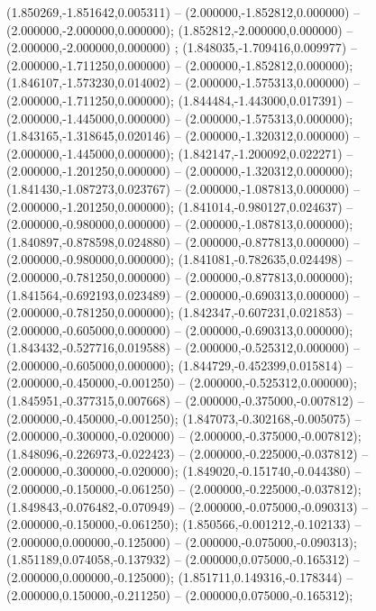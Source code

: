  (1.850269,-1.851642,0.005311) -- (2.000000,-1.852812,0.000000) -- (2.000000,-2.000000,0.000000);
 (1.852812,-2.000000,0.000000) -- (2.000000,-2.000000,0.000000) ;
 (1.848035,-1.709416,0.009977) -- (2.000000,-1.711250,0.000000) -- (2.000000,-1.852812,0.000000);
 (1.846107,-1.573230,0.014002) -- (2.000000,-1.575313,0.000000) -- (2.000000,-1.711250,0.000000);
 (1.844484,-1.443000,0.017391) -- (2.000000,-1.445000,0.000000) -- (2.000000,-1.575313,0.000000);
 (1.843165,-1.318645,0.020146) -- (2.000000,-1.320312,0.000000) -- (2.000000,-1.445000,0.000000);
 (1.842147,-1.200092,0.022271) -- (2.000000,-1.201250,0.000000) -- (2.000000,-1.320312,0.000000);
 (1.841430,-1.087273,0.023767) -- (2.000000,-1.087813,0.000000) -- (2.000000,-1.201250,0.000000);
 (1.841014,-0.980127,0.024637) -- (2.000000,-0.980000,0.000000) -- (2.000000,-1.087813,0.000000);
 (1.840897,-0.878598,0.024880) -- (2.000000,-0.877813,0.000000) -- (2.000000,-0.980000,0.000000);
 (1.841081,-0.782635,0.024498) -- (2.000000,-0.781250,0.000000) -- (2.000000,-0.877813,0.000000);
 (1.841564,-0.692193,0.023489) -- (2.000000,-0.690313,0.000000) -- (2.000000,-0.781250,0.000000);
 (1.842347,-0.607231,0.021853) -- (2.000000,-0.605000,0.000000) -- (2.000000,-0.690313,0.000000);
 (1.843432,-0.527716,0.019588) -- (2.000000,-0.525312,0.000000) -- (2.000000,-0.605000,0.000000);
 (1.844729,-0.452399,0.015814) -- (2.000000,-0.450000,-0.001250) -- (2.000000,-0.525312,0.000000);
 (1.845951,-0.377315,0.007668) -- (2.000000,-0.375000,-0.007812) -- (2.000000,-0.450000,-0.001250);
 (1.847073,-0.302168,-0.005075) -- (2.000000,-0.300000,-0.020000) -- (2.000000,-0.375000,-0.007812);
 (1.848096,-0.226973,-0.022423) -- (2.000000,-0.225000,-0.037812) -- (2.000000,-0.300000,-0.020000);
 (1.849020,-0.151740,-0.044380) -- (2.000000,-0.150000,-0.061250) -- (2.000000,-0.225000,-0.037812);
 (1.849843,-0.076482,-0.070949) -- (2.000000,-0.075000,-0.090313) -- (2.000000,-0.150000,-0.061250);
 (1.850566,-0.001212,-0.102133) -- (2.000000,0.000000,-0.125000) -- (2.000000,-0.075000,-0.090313);
 (1.851189,0.074058,-0.137932) -- (2.000000,0.075000,-0.165312) -- (2.000000,0.000000,-0.125000);
 (1.851711,0.149316,-0.178344) -- (2.000000,0.150000,-0.211250) -- (2.000000,0.075000,-0.165312);
